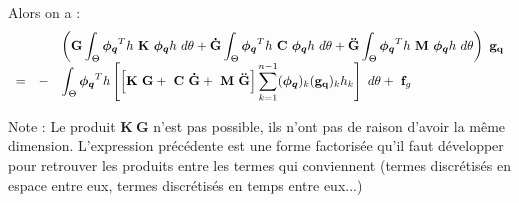\noindent
Alors on a :
\begin{equation}
\begin{array}{r r l}
	&&\displaystyle \left( 
		 \mathbf{G} \int_\Theta		
			\boldsymbol{\phi_q}^Th ~\mathbf{K}~ \boldsymbol{\phi_q}h ~d\theta
	+ 
		\mathbf{\dot{G}} \int_\Theta		
			\boldsymbol{\phi_q}^Th ~\mathbf{C}~ \boldsymbol{\phi_q}h ~d\theta
	+ 
		\mathbf{\ddot{G}} \int_\Theta		
			\boldsymbol{\phi_q}^Th ~\mathbf{M}~ \boldsymbol{\phi_q}h ~d\theta
	  \right) ~\mathbf{g_q}
	\\
	= &-&
	\displaystyle
		\int_\Theta		
			\boldsymbol{\phi_q}^Th  \left[
				\left[
				   \mathbf{K}~ \mathbf{G}
				+ ~\mathbf{C}~ \mathbf{\dot{G}}
				+ ~\mathbf{M}~ \mathbf{\ddot{G}} \right] 
				\sum_{k=1}^{n-1} (\boldsymbol{\phi_q})_k (\mathbf{g_q})_k h_k
				\right] ~d\theta
			+ ~\mathbf{f}_g~ 
\end{array}
\end{equation}

Note : Le produit $\mathbf{K}~\mathbf{G}$ n'est pas possible, ils n'ont pas de raison d'avoir la même dimension. L'expression précédente est une forme factorisée qu'il faut développer pour retrouver les produits entre les termes qui conviennent (termes discrétisés en espace entre eux, termes discrétisés en temps entre eux...)
